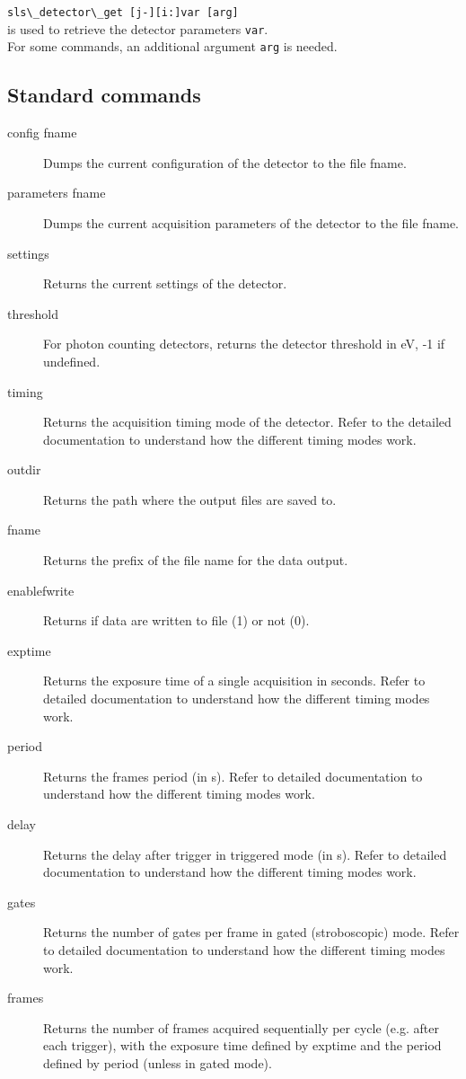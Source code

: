 \documentclass{article}
\begin{document}
\verb=sls\_detector\_get [j-][i:]var [arg]=\\

is used to retrieve the detector parameters \verb=var=.\\
For some commands, an additional argument \verb=arg= is needed.



\subsection{Standard commands}


\begin{description}
\item[config fname] 
Dumps the current configuration of the detector to the file fname.
\item[parameters fname]
 Dumps the current acquisition parameters of the detector to the file fname.
\item[settings] 
Returns the current settings of the detector.
\item[threshold] 
For photon counting detectors, returns the detector threshold in eV, -1 if undefined.
\item[timing]   
Returns the acquisition timing mode of the detector.
Refer to the detailed documentation to understand how the different timing modes work.
\item[outdir] 
Returns the path where the output files are saved to.
\item[fname]
Returns the prefix of the file name for the data output.
\item[enablefwrite] Returns if data are written to file (1) or not (0).
\item[exptime] 
Returns the exposure time of a single acquisition in seconds. 
Refer to detailed documentation to understand how the different timing modes work. 
\item[period]  
Returns the frames period (in s). 
Refer to detailed documentation to understand how the different timing modes work.
\item[delay] 
Returns the delay after trigger in triggered mode (in s). 
Refer to detailed documentation to understand how the different timing modes work.
\item[gates] 
Returns the number of gates per frame in gated (stroboscopic) mode. 
Refer to detailed documentation to understand how the different timing modes work.
\item[frames]  
Returns the number of frames acquired sequentially per cycle (e.g. after each trigger), with the exposure time defined by exptime and the period defined by period (unless in gated mode).

\end{description}
\end{document}
